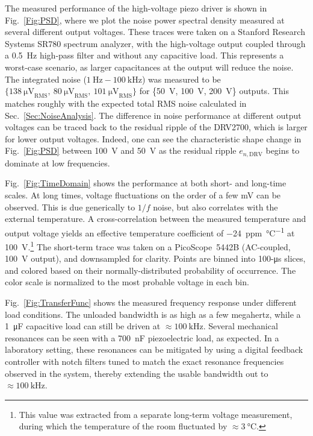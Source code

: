 \documentclass[aip,rsi,reprint]{revtex4-1} %
\begin{document}
The measured performance of the high-voltage piezo driver is shown in Fig.~\ref{Fig:PSD}, where we plot the noise power spectral density measured at several different output voltages.
These traces were taken on a Stanford Research Systems SR780 spectrum analyzer, with the high-voltage output coupled through a \SI{0.5}{\hertz} high-pass filter and without any capacitive load.
This represents a worst-case scenario, as larger capacitances at the output will reduce the noise.
The integrated noise ($\SI{1}{\hertz} - \SI{100}{\kilo\hertz}$) was measured to be $\{\SI{138}{\micro\volt}_\text{RMS},~\SI{80}{\micro\volt}_\text{RMS},~\SI{101}{\micro\volt}_\text{RMS}\}$ for \{\SI{50}{\volt}, \SI{100}{\volt}, \SI{200}{\volt}\} outputs. 
This matches roughly with the expected total RMS noise calculated in Sec.~\ref{Sec:NoiseAnalysis}.
The difference in noise performance at different output voltages can be traced back to the residual ripple of the DRV2700, which is larger for lower output voltages.
Indeed, one can see the characteristic shape change in Fig.~\ref{Fig:PSD} between \SI{100}{\volt} and \SI{50}{\volt} as the residual ripple $e_{n,\text{DRV}}$ begins to dominate at low frequencies.

Fig.~\ref{Fig:TimeDomain} shows the performance at both short- and long-time scales.
At long times, voltage fluctuations on the order of a few \si{\milli\volt} can be observed.
This is due generically to $1/f$ noise, but also correlates with the external temperature.
A cross-correlation between the measured temperature and output voltage yields an effective temperature coefficient of \SI[per-mode=symbol]{-24}{ppm\per\celsius} at \SI{100}{\volt}.\footnote{This value was extracted from a separate long-term voltage measurement, during which the temperature of the room fluctuated by $\approx \SI{3}{\celsius}$.}
The short-term trace was taken on a PicoScope~5442B (AC-coupled, \SI{100}{\volt} output), and downsampled for clarity.
Points are binned into 100-\si{\micro\second} slices, and colored based on their normally-distributed probability of occurrence.
The color scale is normalized to the most probable voltage in each bin.

Fig.~\ref{Fig:TransferFunc} shows the measured frequency response under different load conditions. The unloaded bandwidth is as high as a few megahertz, while a \SI{1}{\micro\farad} capacitive load can still be driven at $\approx\SI{100}{\kilo\hertz}$. 
Several mechanical resonances can be seen with a \SI{700}{\nano\farad} piezoelectric load, as expected.
In a laboratory setting, these resonances can be mitigated by using a digital feedback controller with notch filters tuned to match the exact resonance frequencies observed in the system\cite{Ryou2016a}, thereby extending the usable bandwidth out to $\approx\SI{100}{\kilo\hertz}$.
\end{document}
